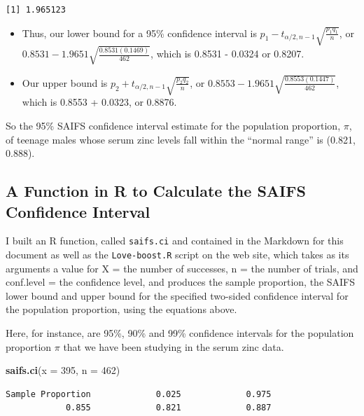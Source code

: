 \documentclass[
]{book}
\newenvironment{Shaded}{\begin{snugshade}}{\end{snugshade}}
\newcommand{\DataTypeTok}[1]{\textcolor[rgb]{0.13,0.29,0.53}{#1}}
\newcommand{\DecValTok}[1]{\textcolor[rgb]{0.00,0.00,0.81}{#1}}
\newcommand{\KeywordTok}[1]{\textcolor[rgb]{0.13,0.29,0.53}{\textbf{#1}}}
\newcommand{\NormalTok}[1]{#1}
\providecommand{\tightlist}{%
  \setlength{\itemsep}{0pt}\setlength{\parskip}{0pt}}
\begin{document}
\begin{verbatim}
[1] 1.965123
\end{verbatim}

\begin{itemize}
\tightlist
\item
  Thus, our lower bound for a 95\% confidence interval is \(p_1 - t_{\alpha/2, n-1}\sqrt{\frac{p_1 q_1}{n}}\), or \(0.8531 - 1.9651 \sqrt{\frac{0.8531(0.1469)}{462}}\), which is 0.8531 - 0.0324 or 0.8207.
\item
  Our upper bound is \(p_2 + t_{\alpha/2, n-1}\sqrt{\frac{p_2 q_2}{n}}\), or \(0.8553 - 1.9651 \sqrt{\frac{0.8553(0.1447)}{462}}\), which is 0.8553 + 0.0323, or 0.8876.
\end{itemize}

So the 95\% SAIFS confidence interval estimate for the population proportion, \(\pi\), of teenage males whose serum zinc levels fall within the ``normal range'' is (0.821, 0.888).

\hypertarget{a-function-in-r-to-calculate-the-saifs-confidence-interval}{%
\subsection{A Function in R to Calculate the SAIFS Confidence Interval}\label{a-function-in-r-to-calculate-the-saifs-confidence-interval}}

I built an R function, called \texttt{saifs.ci} and contained in the Markdown for this document as well as the \texttt{Love-boost.R} script on the web site, which takes as its arguments a value for X = the number of successes, n = the number of trials, and conf.level = the confidence level, and produces the sample proportion, the SAIFS lower bound and upper bound for the specified two-sided confidence interval for the population proportion, using the equations above.

Here, for instance, are 95\%, 90\% and 99\% confidence intervals for the population proportion \(\pi\) that we have been studying in the serum zinc data.

\begin{Shaded}
\begin{Highlighting}[]
\KeywordTok{saifs.ci}\NormalTok{(}\DataTypeTok{x =} \DecValTok{395}\NormalTok{, }\DataTypeTok{n =} \DecValTok{462}\NormalTok{)}
\end{Highlighting}
\end{Shaded}

\begin{verbatim}
Sample Proportion             0.025             0.975 
            0.855             0.821             0.887 
\end{verbatim}
\end{document}
